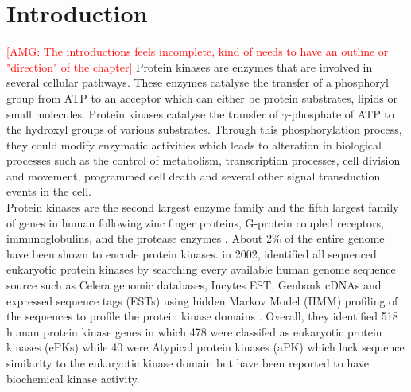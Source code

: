 \documentclass[a4paper, 11pt]{article}
\newcommand{\redcomment}[1]{\textcolor{red}{[#1]}} %
\begin{document}

\section*{Introduction}
\redcomment{AMG: The introductions feels incomplete, kind of needs to have an outline or "direction" of the chapter}
Protein kinases are enzymes that are involved in several cellular pathways. These enzymes catalyse the transfer of a phosphoryl group from ATP to an acceptor which  can either be protein substrates, lipids or small molecules. Protein kinases catalyse the transfer of $\gamma$-phosphate of ATP to the hydroxyl groups of various substrates. Through this phosphorylation process, they could modify enzymatic activities which leads to alteration in biological processes such as the control of metabolism, transcription processes, cell division and movement, programmed cell death and several other signal transduction events in the cell. \\
Protein kinases are the second largest enzyme family and the fifth largest family of genes in human following zinc finger proteins, G-protein coupled receptors, immunoglobulins, and the protease enzymes \cite{roskoski2016classification}. About 2\% of the entire genome have been shown to encode protein kinases. \cite{manning2002protein} in 2002, identified all sequenced eukaryotic protein kinases by searching every available human genome sequence source such as  Celera genomic databases, Incytes EST, Genbank cDNAs and expressed sequence tags (ESTs) using hidden Markov Model (HMM) profiling of the sequences to profile the protein kinase domains \cite{manning2002protein}. Overall, they identified 518 human protein kinase genes in which 478 were classifed as eukaryotic protein kinases (ePKs) while 40 were Atypical protein kinases (aPK) which lack sequence similarity to the eukaryotic kinase domain but have been reported to have biochemical kinase activity.
\end{document}
